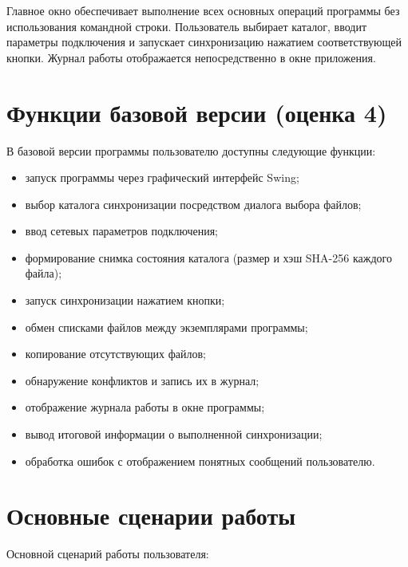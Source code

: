\documentclass[12pt,a4paper]{article}
\begin{document}
Главное окно обеспечивает выполнение всех основных операций программы без использования командной строки. Пользователь выбирает каталог, вводит параметры подключения и запускает синхронизацию нажатием соответствующей кнопки. Журнал работы отображается непосредственно в окне приложения.

\section{Функции базовой версии (оценка 4)}

В базовой версии программы пользователю доступны следующие функции:

\begin{itemize}[nosep]
    \item запуск программы через графический интерфейс Swing;
    \item выбор каталога синхронизации посредством диалога выбора файлов;
    \item ввод сетевых параметров подключения;
    \item формирование снимка состояния каталога (размер и хэш SHA-256 каждого файла);
    \item запуск синхронизации нажатием кнопки;
    \item обмен списками файлов между экземплярами программы;
    \item копирование отсутствующих файлов;
    \item обнаружение конфликтов и запись их в журнал;
    \item отображение журнала работы в окне программы;
    \item вывод итоговой информации о выполненной синхронизации;
    \item обработка ошибок с отображением понятных сообщений пользователю.
\end{itemize}

\section{Основные сценарии работы}

Основной сценарий работы пользователя:
\end{document}
